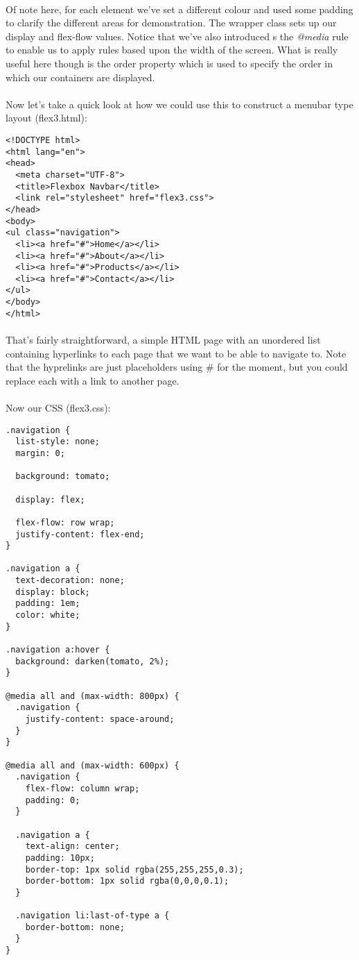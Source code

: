 \documentclass[10pt, a4paper, twosize]{article}
\begin{document}
\paragraph{} Of note here, for each element we've set a different colour and used some padding to clarify the different areas for demonstration. The wrapper class sets up our display and flex-flow values. Notice that we've also introduced s the \emph{@media} rule to enable us to apply rules based upon the width of the screen. What is really useful here though is the order property which is used to specify the order in which our containers are displayed.

\paragraph{} Now let's take a quick look at how we could use this to construct a menubar type layout (flex3.html):
\begin{lstlisting}
<!DOCTYPE html>
<html lang="en">
<head>
  <meta charset="UTF-8">
  <title>Flexbox Navbar</title>
  <link rel="stylesheet" href="flex3.css">
</head>
<body>
<ul class="navigation">
  <li><a href="#">Home</a></li>
  <li><a href="#">About</a></li>
  <li><a href="#">Products</a></li>
  <li><a href="#">Contact</a></li>
</ul>
</body>
</html>
\end{lstlisting}
\paragraph{} That's fairly straightforward, a simple HTML page with an unordered list containing hyperlinks to each page that we want to be able to navigate to. Note that the hyprelinks are just placeholders using \# for the moment, but you could replace each with a link to another page.

\paragraph{} Now our CSS (flex3.css):
\begin{lstlisting}
.navigation {
  list-style: none;
  margin: 0; 
  
  background: tomato;
  
  display: flex;
  
  flex-flow: row wrap;
  justify-content: flex-end;
}

.navigation a {
  text-decoration: none;
  display: block;
  padding: 1em;
  color: white;
}

.navigation a:hover {
  background: darken(tomato, 2%);
}

@media all and (max-width: 800px) {
  .navigation {
    justify-content: space-around;
  }
}

@media all and (max-width: 600px) {
  .navigation {
    flex-flow: column wrap;
    padding: 0;
  }
  
  .navigation a { 
    text-align: center; 
    padding: 10px;
    border-top: 1px solid rgba(255,255,255,0.3); 
    border-bottom: 1px solid rgba(0,0,0,0.1); 
  }
  
  .navigation li:last-of-type a {
    border-bottom: none;
  }
}
\end{lstlisting}
\end{document}
